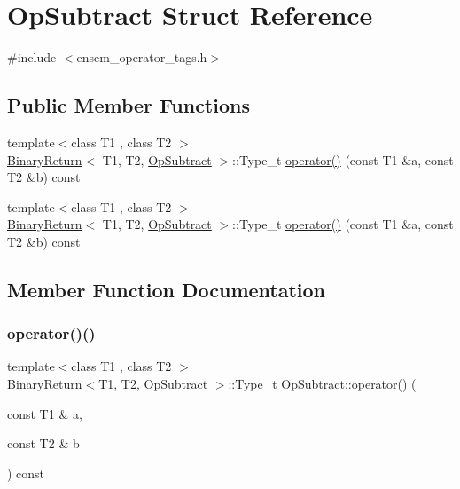 \hypertarget{structOpSubtract}{}\section{Op\+Subtract Struct Reference}
\label{structOpSubtract}


{\ttfamily \#include $<$ensem\+\_\+operator\+\_\+tags.\+h$>$}

\subsection*{Public Member Functions}
\begin{DoxyCompactItemize}
\item 
{\footnotesize template$<$class T1 , class T2 $>$ }\\\mbox{\hyperlink{structBinaryReturn}{Binary\+Return}}$<$ T1, T2, \mbox{\hyperlink{structOpSubtract}{Op\+Subtract}} $>$\+::Type\+\_\+t \mbox{\hyperlink{structOpSubtract_a977cd29c1df947e7958b86dd98eee321}{operator()}} (const T1 \&a, const T2 \&b) const
\item 
{\footnotesize template$<$class T1 , class T2 $>$ }\\\mbox{\hyperlink{structBinaryReturn}{Binary\+Return}}$<$ T1, T2, \mbox{\hyperlink{structOpSubtract}{Op\+Subtract}} $>$\+::Type\+\_\+t \mbox{\hyperlink{structOpSubtract_a977cd29c1df947e7958b86dd98eee321}{operator()}} (const T1 \&a, const T2 \&b) const
\end{DoxyCompactItemize}


\subsection{Member Function Documentation}
\mbox{\label{structOpSubtract_a977cd29c1df947e7958b86dd98eee321}} 
\subsubsection{\texorpdfstring{operator()()}{operator()()}\hspace{0.1cm}{\footnotesize\ttfamily [1/2]}}
{\footnotesize\ttfamily template$<$class T1 , class T2 $>$ \\
\mbox{\hyperlink{structBinaryReturn}{Binary\+Return}}$<$T1, T2, \mbox{\hyperlink{structOpSubtract}{Op\+Subtract}} $>$\+::Type\+\_\+t Op\+Subtract\+::operator() (\begin{DoxyParamCaption}\item[{const T1 \&}]{a,  }\item[{const T2 \&}]{b }\end{DoxyParamCaption}) const\hspace{0.3cm}{\ttfamily [inline]}}

